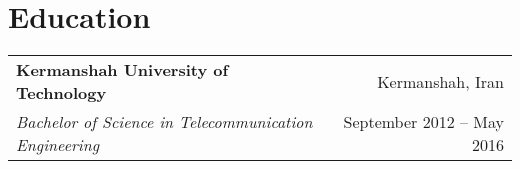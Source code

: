 \documentclass[letterpaper,11pt]{article}
\makeatletter
\newcommand{\resumeItem}[2]{
  \item\small{
    \textbf{#1}{: #2 \vspace{-2pt}}
  }
}
\newcommand{\resumeItemSimple}[1]{
  \item\small{
    {#1}
  }
}
\newcommand{\resumeSubheading}[4]{
  \vspace{-1pt}
    \begin{tabular*}{1\textwidth}[t]{l@{\extracolsep{\fill}}r}
      \textbf{#1} & #2 \\
      \textit{\small#3} & \small #4 \\
    \end{tabular*}\vspace{-4px}
}
\newcommand{\resumeSubheadingSimple}[5]{
    \begin{tabular*}{1\textwidth}[t]{l@{\extracolsep{\fill}}r}
      \textbf{#1}, \textbf{\href{#3}{#2}} \space \small#4 & \small#5 \\
    \end{tabular*}
}
\newcommand{\resumeSubSubheading}[2]{
    \begin{tabular*}{1\textwidth}{l@{\extracolsep{\fill}}r}
      \textit{\small#1} & \small #2 \\
    \end{tabular*}\vspace{-1pt}
}
\newcommand{\resumeSubItem}[2]{\resumeItem{#1}{#2}\vspace{-4pt}}
\newcommand{\resumeSubHeadingListStart}{\begin{itemize}[leftmargin=*]}
\newcommand{\resumeSubHeadingListEnd}{\end{itemize}}
\newcommand{\resumeItemListStart}{\begin{itemize}[leftmargin=0.5cm, itemsep=1pt, parsep=0pt]} %
\newcommand{\resumeItemListEnd}{\end{itemize}}
\makeatother
\begin{document}


\section{Education}

    \resumeSubheading
      {Kermanshah University of Technology}{Kermanshah, Iran}
      {Bachelor of Science in Telecommunication Engineering}{September 2012 -- May 2016}


\end{document}
